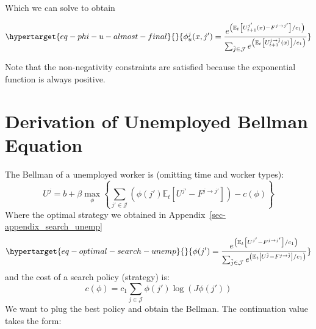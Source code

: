 \documentclass[
  letterpaper,
  DIV=11,
  numbers=noendperiod]{scrreprt}
\begin{document}
Which we can solve to obtain

\begin{equation}\protect\hypertarget{eq-phi-u-almost-final}{}{
  \phi^j_u(x,j') = \frac{e^{\left(\mathbb{E}_t\left[U^{j'}_{t+1}(x) - F^{j \to j'}\right] /c_1\right)}}{\sum_{\tilde{j}\in \mathcal{J}}e^{\left(\mathbb{E}_t\left[U^{j \to \tilde{j}}_{t+1}(x)\right] /c_1\right)}}}\label{eq-phi-u-almost-final}\end{equation}

Note that the non-negativity constraints are satisfied because the
exponential function is always positive.

\hypertarget{sec-appendix_bellman_unemp}{%
\chapter{Derivation of Unemployed Bellman
Equation}\label{sec-appendix_bellman_unemp}}

The Bellman of a unemployed worker is (omitting time and worker types):
\[U^{j} = b + \beta\max_{\phi}\left\{\sum_{j'\in \mathcal{J}} \left(\phi(j')\mathbb{E}_t\left[U^{j'} - F^{j \to j'} \right]\right) -c(\phi) \right\}\]
Where the optimal strategy we obtained in
Appendix~\ref{sec-appendix_search_unemp}
\begin{equation}\protect\hypertarget{eq-optimal-search-unemp}{}{\phi(j') = \frac{e^{\left(\mathbb{E}_t\left[U^{j'} - F^{j \to j'}\right] /c_1\right)}}{\sum_{\tilde{j}\in \mathcal{J}}e^{\left(\mathbb{E}_t\left[U^{\tilde{j}} - F^{j \to \tilde{j}}\right] /c_1\right)}}}\label{eq-optimal-search-unemp}\end{equation}
and the cost of a search policy (strategy) is:
\[c(\phi) = c_{1} \sum_{j\in \mathcal{J}}\phi(j')\log(J \phi(j'))\] We
want to plug the best policy and obtain the Bellman. The continuation
value takes the form:
\end{document}
